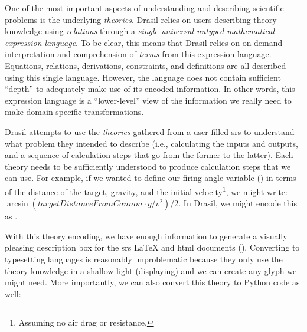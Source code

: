 One of the most important aspects of understanding and describing scientific
problems is the underlying \textit{theories}. Drasil relies on users describing
theory knowledge using \textit{relations} through a \textit{single universal
      untyped mathematical expression language}. To be clear, this means that Drasil
relies on on-demand interpretation and comprehension of \textit{terms} from this
expression language. Equations, relations, derivations, constraints, and
definitions are all described using this single language. However, the language
does not contain sufficient ``depth'' to adequately make use of its encoded
information. In other words, this expression language is a ``lower-level'' view
of the information we really need to make domain-specific transformations.

Drasil attempts to use the \textit{theories} gathered from a user-filled
\acs{srs} to understand what problem they intended to describe (i.e.,
calculating the inputs and outputs, and a sequence of calculation steps that go
from the former to the latter). Each theory needs to be sufficiently understood
to produce calculation steps that we can use. For example, if we wanted to
define our firing angle variable () in terms
of the distance of the target, gravity, and the initial
velocity\footnote{Assuming no air drag or resistance.}, we might write:
\(\arcsin{}(\mathit{targetDistanceFromCannon} \cdot{} g / v^2) / 2\). In Drasil,
we might encode this as .

\exampleAngleEquationEncoding{}

With this theory encoding, we have enough information to generate a visually
pleasing description box for the \acs{srs} \LaTeX{} and \acs{html} documents
(). Converting to typesetting languages
is reasonably unproblematic because they only use the theory knowledge in a
shallow light (displaying) and we can create any glyph we might need. More
importantly, we can also convert this theory to Python code as well:

\exampleAngleEquationEncodingToPython{}

